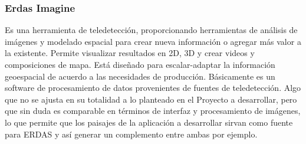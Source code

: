 \documentclass[12pt]{article} %
\begin{document}
\subsubsection{Erdas Imagine}
Es una herramienta de teledetección, proporcionando herramientas de análisis de imágenes y modelado espacial para crear nueva información o agregar más valor a la existente. Permite visualizar resultados en 2D, 3D y crear  videos y composiciones de mapa. 
Está diseñado para escalar-adaptar la información geoespacial de acuerdo a las necesidades de producción. 
Básicamente es un software de procesamiento de datos provenientes de fuentes de teledetección. Algo que no se ajusta en su totalidad a lo planteado en el Proyecto a desarrollar, pero que sin duda es comparable en términos de interfaz y procesamiento de imágenes, lo que permite que los paisajes de la aplicación a desarrollar sirvan como fuente para ERDAS y así generar un complemento entre ambas por ejemplo. 


\end{document}
